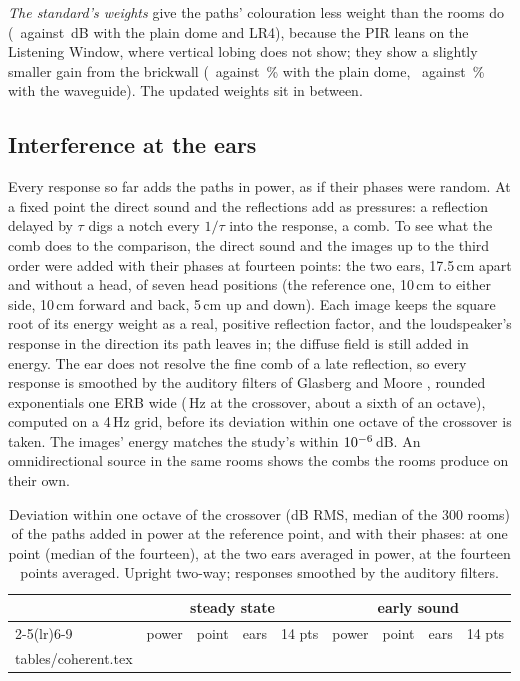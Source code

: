 \documentclass[11pt,a4paper]{article}
\makeatletter
\newcommand{\rows}[1]{\@@input tables/#1.tex }
\makeatother
\begin{document}
\emph{The standard's weights} give the paths' colouration less weight than the rooms do
(\ncolDomeLrFourPir\ against \ncolDomeLrFourSteady\,dB with the plain dome and LR4), because the PIR leans
on the Listening Window, where vertical lobing does not show; they show a slightly smaller gain from
the brickwall (\ncolDomeRedPir\ against \ncolDomeRedSteady\,\% with the plain dome, \ncolWgRedPir\ against
\ncolWgRedSteady\,\% with the waveguide). The updated weights sit in between.

\clearpage
\subsection{Interference at the ears}
\label{sec:interference}

Every response so far adds the paths in power, as if their phases were random. At a fixed point the
direct sound and the reflections add as pressures: a reflection delayed by $\tau$ digs a notch every
$1/\tau$ into the response, a comb. To see what the comb does to the comparison, the direct sound and
the images up to the third order were added with their phases at fourteen points: the two ears,
17.5\,cm apart and without a head, of seven head positions (the reference one, 10\,cm to either side,
10\,cm forward and back, 5\,cm up and down). Each image keeps the square root of its energy weight as a
real, positive reflection factor, and the loudspeaker's response in the direction its path leaves in;
the diffuse field is still added in energy. The ear does not resolve the fine comb of a late
reflection, so every response is smoothed by the auditory filters of Glasberg and Moore
\cite{glasberg1990}, rounded exponentials one ERB wide (\nerbCrossover\,Hz at the crossover, about a sixth
of an octave), computed on a 4\,Hz grid, before its deviation within one octave of the crossover is
taken. The images' energy matches the study's within $10^{-6}$\,dB. An omnidirectional source in the
same rooms shows the combs the rooms produce on their own.

\begin{table}[t]
\centering
\caption{Deviation within one octave of the crossover (dB RMS, median of the 300 rooms) of the paths
added in power at the reference point, and with their phases: at one point (median of the fourteen),
at the two ears averaged in power, at the fourteen points averaged. Upright two-way; responses
smoothed by the auditory filters.}
\label{tab:coherent}
\small
\begin{tabular}{lrrrrrrrr}
\toprule
& \multicolumn{4}{c}{steady state} & \multicolumn{4}{c}{early sound} \\
\cmidrule(lr){2-5}\cmidrule(lr){6-9}
& power & point & ears & 14 pts & power & point & ears & 14 pts \\
\midrule
\rows{coherent}
\bottomrule
\end{tabular}
\end{table}
\end{document}
